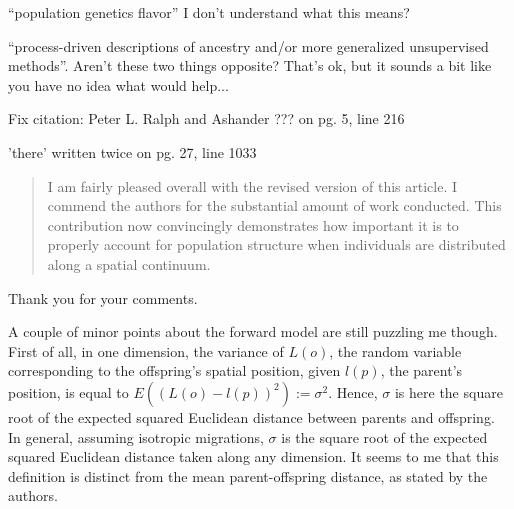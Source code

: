 \begin{point}{``population genetics flavor'' \revref}
I don't understand what this means?
\end{point}


\begin{point}{\revref}
``process-driven descriptions of ancestry and/or more generalized unsupervised methods''. Aren't these two things opposite? That's ok, but it sounds a bit like you have no idea what would help...
\end{point}



\begin{point}{}
 Fix citation: Peter L. Ralph and Ashander ??? on pg. 5, line 216
\end{point}


\begin{point}{}
'there' written twice on pg. 27, line 1033
\end{point}







\begin{quote}
I am fairly pleased overall with the revised version of this article. I commend the authors for the substantial amount of work conducted. This contribution now convincingly demonstrates how important it is to properly account for population structure when individuals are distributed along a spatial continuum.
\end{quote}

Thank you for your comments. 

\begin{point}{}
A couple of minor points about the forward model are still puzzling me though. First of all, in one dimension, the variance of $L(o)$, the random variable corresponding to the offspring's spatial position, given $l(p)$, the parent's position, is equal to $E((L(o)-l(p))^2):=\sigma^2$. Hence, $\sigma$ is here the square root of the expected squared Euclidean distance between parents and offspring. In general, assuming isotropic migrations, $\sigma$ is the square root of the expected squared Euclidean distance taken along any dimension. It seems to me that this definition is distinct from the mean parent-offspring distance, as stated by the authors.
\end{point}

